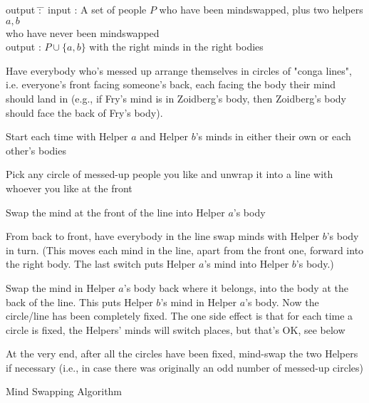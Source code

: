 \begin{algorithm} 
\begin{tabbing}
output \= : \= \kill
input \> : \> A set of people $P$ who have been mindswapped, plus two helpers $a,b$ \\
\>\>who have never been mindswapped \\
output \> : \> $P \cup \{a,b\}$ with the right minds in the right bodies \\
\end{tabbing}

\begin{algorithmic}[1]

\State Have everybody who's messed up arrange themselves in circles of "conga lines", i.e. everyone's front facing someone's back, each facing the body their mind should land in (e.g., if Fry's mind is in Zoidberg's body, then Zoidberg's body should face the back of Fry's body).


	\State Start each time with Helper $a$ and Helper $b$'s minds in either their own or each other's bodies

	\State Pick any circle of messed-up people you like and unwrap it into a line with whoever you like at the front

	\State Swap the mind at the front of the line into Helper $a$'s body

	\State From back to front, have everybody in the line swap minds with Helper $b$'s body in turn. (This moves each mind in the line, apart from the front one, forward into the right body. The last switch puts Helper $a$'s mind into Helper $b$'s body.)

	\State Swap the mind in Helper $a$'s body back where it belongs, into the body at the back of the line. This puts Helper $b$'s mind in Helper $a$'s body. Now the circle/line has been completely fixed. The one side effect is that for each time a circle is fixed, the Helpers' minds will switch places, but that's OK, see below\label{algline:swap:return}
\EndFor

\State At the very end, after all the circles have been fixed, mind-swap the two Helpers if necessary (i.e., in case there was originally an odd number of messed-up circles) 

\end{algorithmic}
\vspace{1em}
\caption{Mind Swapping Algorithm \cite{theoremofbenda}}
\label{alg:swap}
\end{algorithm}

